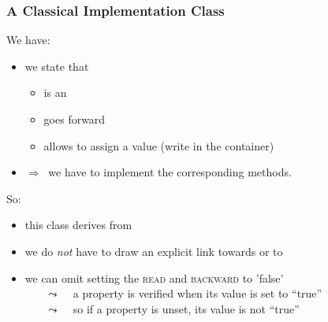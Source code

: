 \begin{frame}
  \frametitle{A Classical Implementation Class}

We have:
\smallskip

\begin{itemize}
\scriptsize
\item we {\color{mediumgreen}{explicitly}} state that \bfarrayiteratorT
  \begin{itemize} \scriptsize
  \item is an \bfIterator
  \item goes forward
  \item allows to assign a value (write in the container)
  \end{itemize}
\item $\Rightarrow ~ $ we have to implement the corresponding methods.
\end{itemize}

\bigskip

So:
\smallskip

\begin{itemize}
  \scriptsize
\item this class derives from \bftop 
\item we do \textit{not} have to draw an explicit link towards
  \bfForwardIterator or to \bfWriteOnlyIterator
\item we can omit setting the \textsc{read} and \textsc{backward} to
  'false'\\
  ~~~ {\scriptsize $\leadsto$ ~ a property is verified when its value is set to ``true'' }\\
  ~~~ {\scriptsize $\leadsto$ ~ so if a property is unset, its value is not ``true'' }\\
\end{itemize}

\end{frame}




